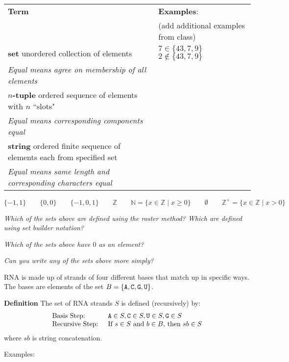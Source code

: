 \documentclass[12pt, oneside]{article}
\begin{document}
\begin{center}
\begin{tabular}{p{4.4in}p{2.8in}}
{\bf  Term} & {\bf Examples}:\\
&  (add additional examples from class)\\
\hline 
{\bf set} \newline
unordered collection of elements & $7 \in \{43, 7, 9 \}$ \qquad $2 \notin \{43, 7, 9 \}$ \\
{\it Equal means agree on membership of all elements}& \\
\hline
{\bf $n$-tuple} \newline
ordered sequence of elements with $n$ ``slots" & \\
{\it Equal means corresponding components equal}& \\
\hline
{\bf string} \newline
ordered finite sequence of elements each from specified
set & \\
{\it Equal means same length and corresponding characters equal}
\end{tabular}
\end{center}
\[
\{ -1, 1\} \qquad 
\{0, 0 \} \qquad
\{-1, 0, 1 \} \qquad
\mathbb{Z} \qquad
\mathbb{N} = \{ x \in \mathbb{Z} \mid x \geq 0 \} \qquad
\emptyset \qquad
\mathbb{Z}^+ = \{ x \in \mathbb{Z}  \mid x > 0 \}
\]

\vfill

{\it Which of the sets above are defined using the roster method? Which are defined using set builder notation?}

{\it Which of the sets above have $0$ as an element?}

{\it Can you write any of the sets above more simply?}

\vfill

RNA is made up of strands of four different bases that match up in specific ways.\\
The bases are elements of the set 
$B  = \{\texttt{A}, \texttt{C}, \texttt{G}, \texttt{U} \}$.


{\bf Definition} The set of RNA strands $S$ is defined (recursively) by:
\[
\begin{array}{ll}
\textrm{Basis Step: } & \texttt{A} \in S, \texttt{C} \in S, \texttt{U} \in S, \texttt{G} \in S \\
\textrm{Recursive Step: } & \textrm{If } s \in S\textrm{ and }b \in B \textrm{, then }sb \in S
\end{array}
\]
where $sb$ is string concatenation.

Examples: 
\end{document}
